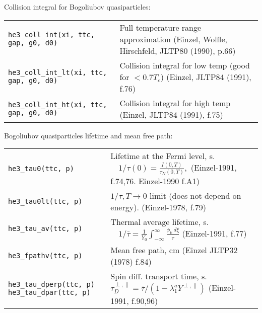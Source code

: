 \documentclass[a4paper]{article}
\begin{document}
\medskip

Collision integral for Bogoliubov quasiparticles:

\medskip
\noindent\begin{tabular}{lp{11cm}}
\tt he3\_coll\_int(xi, ttc, gap, g0, d0) &
   Full temperature range approximation\newline
   {\small (Einzel, Wolfle, Hirschfeld, JLTP80 (1990), p.66)}\\
\tt he3\_coll\_int\_lt(xi, ttc, gap, g0, d0) &
   Collision integral for low temp (good for $< 0.7 T_c$)\newline
   {\small (Einzel, JLTP84 (1991), f.76)}\\
\tt he3\_coll\_int\_ht(xi, ttc, gap, g0, d0) &
   Collision integral for high temp\newline
   {\small (Einzel, JLTP84 (1991), f.75)}\\
\end{tabular}
\medskip

Bogoliubov quasiparticles lifetime and mean free path:

\medskip
\noindent\begin{tabular}{p{4cm}p{11cm}}
\tt he3\_tau0(ttc, p)      & Lifetime at the Fermi level, s.
                           $\displaystyle\quad 1/\tau(0) = \frac{I (0,T)}{\tau_N(0,T)},$\newline
                            {\small(Einzel-1991, f.74,76. Einzel-1990 f.A1)}\\

\tt he3\_tau0lt(ttc, p)    & $\displaystyle 1/\tau, T\rightarrow0$ limit (does not depend on energy).
                            {\small(Einzel-1978, f.79)}\\
\tt he3\_tau\_av(ttc, p)   & Thermal average lifetime, s.
                           $\displaystyle\quad 1/\bar\tau = \frac{1}{Y_0}
                           \int_{-\infty}^{\infty} \frac{\phi_k\ d\xi}{\tau}$\newline
                            {\small(Einzel-1991, f.77)}\\
\tt he3\_fpathv(ttc, p)    & Mean free path, cm\newline
                             {\small (Einzel JLTP32 (1978) f.84)}\\

\tt he3\_tau\_dperp(ttc, p)\newline
\tt he3\_tau\_dpar(ttc, p)  & Spin diff. transport time, s.
                           \ $\tau_D^{\perp,\parallel} = \bar\tau
                            /(1-\lambda_1^a Y^{\perp,\parallel})$\newline
                            {\small(Einzel-1991, f.90,96)}\\
\end{tabular}
\medskip
\end{document}
